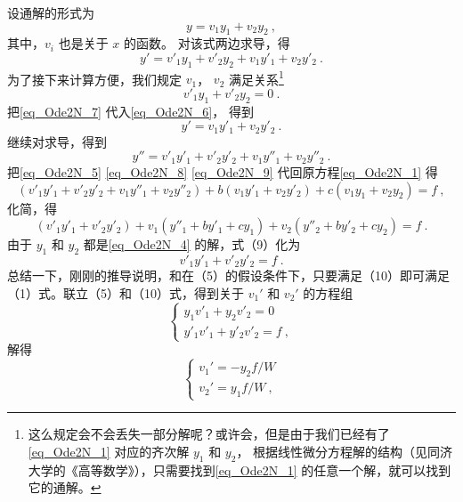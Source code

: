 设通解的形式为
\begin{equation}\label{eq_Ode2N_5}
y = v_1 y_1 + v_2 y_2~,
\end{equation}
其中，$v_i$ 也是关于 $x$ 的函数。 对该式两边求导，得
\begin{equation}\label{eq_Ode2N_6}
y' = v'_1 y_1 + v'_2 y_2 + v_1 y'_1 + v_2 y'_2~.
\end{equation}
为了接下来计算方便，我们规定 $v_1$， $v_2$ 满足关系\footnote{这么规定会不会丢失一部分解呢？或许会，但是由于我们已经有了\autoref{eq_Ode2N_1} 对应的齐次解 $y_1$ 和 $y_2$， 根据线性微分方程解的结构（见同济大学的《高等数学》），只需要找到\autoref{eq_Ode2N_1} 的任意一个解，就可以找到它的通解。}
\begin{equation}\label{eq_Ode2N_7}
v'_1 y_1 + v'_2 y_2 = 0~.
\end{equation}
把\autoref{eq_Ode2N_7} 代入\autoref{eq_Ode2N_6}， 得到
\begin{equation}\label{eq_Ode2N_8}
y' = v_1 y'_1 + v_2 y'_2~.
\end{equation}
继续对求导，得到
\begin{equation}\label{eq_Ode2N_9}
y'' = v'_1 y'_1 + v'_2 y'_2 + v_1 y''_1 + v_2 y''_2~.
\end{equation}
把\autoref{eq_Ode2N_5} \autoref{eq_Ode2N_8} \autoref{eq_Ode2N_9} 代回原方程\autoref{eq_Ode2N_1} 得
\begin{equation}
(v'_1 y'_1 + v'_2 y'_2 + v_1 y''_1 + v_2 y''_2) + b (v_1 y'_1 + v_2 y'_2) + c(v_1 y_1 + v_2 y_2) = f~,
\end{equation}
化简，得
\begin{equation}
(v'_1 y'_1 + v'_2 y'_2) + v_1 ( y''_1 + b y'_1 + c y_1) + v_2 ( y''_2 + b y'_2 + c y_2) = f ~.\end{equation}
由于 $y_1$ 和 $y_2$ 都是\autoref{eq_Ode2N_4} 的解，式（9）化为 %
\begin{equation} v'_1 y'_1 + v'_2 y'_2 = f~.
\end{equation}
总结一下，刚刚的推导说明，和在（5）的假设条件下，只要满足（10）即可满足（1）式。联立（5）和（10）式，得到关于 $v_1'$ 和 $v_2'$ 的方程组
\begin{equation}
\begin{cases}
y_1 v'_1 + y_2 v'_2 = 0\\
y'_1 v'_1 + y'_2 v'_2 = f~,
\end{cases}
\end{equation}
解得
\begin{equation}
\begin{cases}
v_1' = -y_2f/W\\
v_2' = y_1 f/W~,
\end{cases}
\end{equation}
